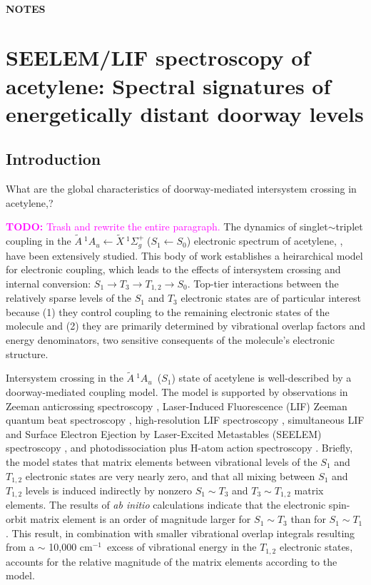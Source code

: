 \documentclass[12pt]{mitthesis}
\newcommand{\TODO} [1]{\textcolor{magenta}{\textbf{TODO:} #1}}
\newcommand{\rcm}{cm$^{-1}$}
\newcommand{\bigspace}{$
  \;
  $}
\newcommand{\astate}{$
  \tilde{A} \: ^1\!A_u
  $}
\newcommand{\AtoX}{$
  \tilde{A} \: ^1\!A_u 
  \leftarrow 
  \tilde{X} \: ^1\Sigma_g^+
  $}
\newcommand{\StoS}{$
  S_1 \leftarrow S_0
  $}
\begin{document}
\tableofcontents
\clearpage

\listoffigures
\clearpage

\subsubsection*{NOTES}

\clearpage

\setcounter{chapter}{3}
\chapter{SEELEM/LIF spectroscopy of acetylene: Spectral signatures of
  energetically distant doorway levels}

\section{Introduction}

What are the global characteristics of doorway-mediated intersystem
crossing in acetylene,?  


\TODO{Trash and rewrite the entire
  paragraph.}  The dynamics of singlet$\sim$triplet coupling in the
\AtoX \bigspace (\StoS) electronic spectrum of acetylene, ,
have been extensively studied.  This body of work establishes a
heirarchical model for electronic coupling, which leads to the effects
of intersystem crossing and internal conversion: $S_1 \rightarrow T_3
\rightarrow T_{1,2} \rightarrow S_0$.  Top-tier interactions between
the relatively sparse levels of the $S_1$ and $T_3$ electronic states
are of particular interest because (1) they control coupling to the
remaining electronic states of the molecule and (2) they are primarily
determined by vibrational overlap factors and energy denominators, two
sensitive consequents of the molecule's electronic structure.

Intersystem crossing in the \astate\ ($S_1$) state of acetylene is
well-described by a doorway-mediated coupling model.  The model is
supported by observations in Zeeman anticrossing spectroscopy
\cite{dupre91, dupre95a, dupre95b}, Laser-Induced Fluorescence (LIF)
Zeeman quantum beat spectroscopy \cite{ochi87, ochi91, dupre93},
high-resolution LIF spectroscopy \cite{drabbels94, altunata01},
simultaneous LIF and Surface Electron Ejection by Laser-Excited
Metastables (SEELEM) spectroscopy \cite{humphrey97, altunata00,
  mishra04}, and photodissociation plus H-atom action spectroscopy
\cite{yamakita03, loffler98, mordaunt98}.  Briefly, the model states
that matrix elements between vibrational levels of the $S_1$ and
$T_{1,2}$ electronic states are very nearly zero, and that all mixing
between $S_1$ and $T_{1,2}$ levels is induced indirectly by nonzero
$S_1 \sim T_3$ and $T_3 \sim T_{1,2}$ matrix elements.  The results of
\emph{ab initio} calculations indicate that the electronic spin-orbit
matrix element is an order of magnitude larger for $S_1 \sim T_3$ than
for $S_1 \sim T_1$.  This result, in combination with smaller
vibrational overlap integrals resulting from a $\sim$ 10,000 \rcm\
excess of vibrational energy in the $T_{1,2}$ electronic states,
accounts for the relative magnitude of the matrix elements according
to the model.
\end{document}
